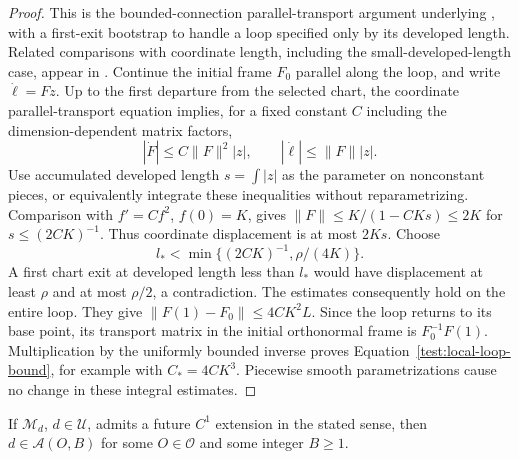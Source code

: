 \begin{proof}
This is the bounded-connection parallel-transport argument underlying
\cite[Lemma~2.13]{Sbierski2022}, with a first-exit bootstrap to handle
a loop specified only by its developed length. Related comparisons
with coordinate length, including the small-developed-length case,
appear in \cite[Lemma~4.2 and Corollary~4.12]{Sbierski2024}.
Continue the initial frame $F_0$ parallel along the loop, and write
$\dot\ell=Fz$. Up to the first departure from the selected chart,
the coordinate parallel-transport equation implies, for a fixed
constant $C$ including the dimension-dependent matrix factors,
\[
 |\dot F|\le C\lVert F\rVert^2|z|,
 \qquad |\dot\ell|\le\lVert F\rVert|z|.
\]
Use accumulated developed length
$s=\int|z|$ as the parameter on nonconstant pieces, or equivalently
integrate these inequalities without reparametrizing. Comparison with
$f'=Cf^2$, $f(0)=K$, gives
$\lVert F\rVert\le K/(1-CKs)\le2K$ for
$s\le(2CK)^{-1}$. Thus coordinate displacement is at most $2Ks$.
Choose
\[
 l_*<\min\{(2CK)^{-1},\rho/(4K)\}.
\]
A first chart exit at developed length less than $l_*$ would have
displacement at least $\rho$ and at most $\rho/2$, a
contradiction. The estimates consequently hold on the entire loop.
They give
$\lVert F(1)-F_0\rVert\le4CK^2L$. Since the loop returns to its
base point, its transport matrix in the initial orthonormal frame is
$F_0^{-1}F(1)$. Multiplication by the uniformly bounded inverse proves
Equation~\eqref{test:local-loop-bound}, for example with
$C_*=4CK^3$. Piecewise smooth parametrizations cause no change in
these integral estimates.
\end{proof}

\begin{proposition}
\label{test:exit-cover}
If $\mathcal M_d$, $d\in\mathcal U$, admits a future $C^1$
extension in the stated sense, then $d\in\mathcal A(O,B)$ for
some $O\in\mathcal O$ and some integer $B\ge1$.
\end{proposition}

